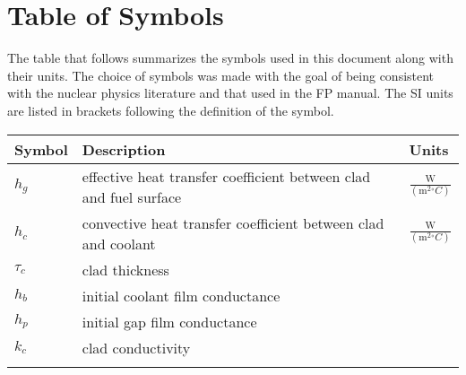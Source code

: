 \documentclass[12pt]{article}
\begin{document}
\section{Table of Symbols}
\label{Sec:ToS}
The table that follows summarizes the symbols used in this document along with their units.  The choice of symbols was made with the goal of being consistent with the nuclear physics literature and that used in the FP manual.  The SI units are listed in brackets following the definition of the symbol.
\begin{longtable*}{l l l}
\toprule
Symbol & Description & Units
\\
\midrule
$h_{g}$ & effective heat transfer coefficient between clad and fuel surface & $\frac{\text{W}}{(\text{m}^{2}{}^{\circ}C)}$
\\
$h_{c}$ & convective heat transfer coefficient between clad and coolant & $\frac{\text{W}}{(\text{m}^{2}{}^{\circ}C)}$
\\
$\tau{}_{c}$ & clad thickness & 
\\
$h_{b}$ & initial coolant film conductance & 
\\
$h_{p}$ & initial gap film conductance & 
\\
$k_{c}$ & clad conductivity & 
\\
\bottomrule
\label{Table:ToS}
\end{longtable*}
\end{document}
